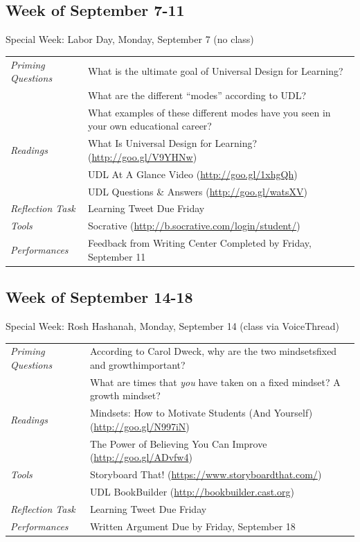 \documentclass{tufte-handout}
\newcommand{\tabpq}{\faQuestionCircle\medspace\textit{Priming Questions}}
\newcommand{\tabread}{\faBook\medspace\textit{Readings}}
\newcommand{\tabperformance}{\faTasks\medspace\textit{Performances}}
\newcommand{\tabtools}{\faWrench\medspace\textit{Tools}}
\newcommand{\tabtweet}{\faLightbulbO\medspace\textit{Reflection Task} & Learning Tweet Due Friday \\}
\newenvironment{tabsched}
	{\small
	\begin{tabular}{p{1.5in}p{4.5in}}
	\toprule}
	{\bottomrule
	\end{tabular}
	\normalsize}
\newenvironment{specweek}
	{\begin{center}
		\fontseries{b} \faBullhorn \medspace Special Week: }
		{\medspace \faBullhorn \fontseries{m}
	\end{center}}
\newcommand{\weekfour}{September 7-11}
\newcommand{\weekfive}{September 14-18}
\newcommand{\laborday}{Labor Day, Monday, September 7 (no class)}
\newcommand{\roshhashanah}{Rosh Hashanah, Monday, September 14 (class via VoiceThread)}
\begin{document}
\subsection{Week of \weekfour}

\begin{specweek}\laborday\end{specweek}

\begin{tabsched}
	\tabpq & What is the ultimate goal of Universal Design for Learning? \\
	& What are the different \enquote{modes} according to UDL? \\
	& What examples of these different modes have you seen in your own educational career? \\
	\midrule
	\tabread & What Is Universal Design for Learning? (\url{http://goo.gl/V9YHNw}) \\
	& UDL At A Glance Video (\url{http://goo.gl/1xhgQh}) \\
	& UDL Questions \& Answers (\url{http://goo.gl/watsXV}) \\
	\midrule
	\tabtweet
	\midrule
	\tabtools & Socrative (\url{http://b.socrative.com/login/student/}) \\
	\midrule
	\tabperformance & Feedback from Writing Center Completed by Friday, September 11 \\
\end{tabsched}
\newpage
\subsection{Week of \weekfive}

\begin{specweek}\roshhashanah\end{specweek}

\begin{tabsched}
	\tabpq & According to Carol Dweck, why are the two mindsets\textemdash{}fixed and growth\textemdash{}important? \\
	& What are times that \emph{you} have taken on a fixed mindset? A growth mindset? \\
	\midrule
	\tabread & Mindsets: How to Motivate Students (And Yourself) (\url{http://goo.gl/N997iN}) \\
	& The Power of Believing You Can Improve (\url{http://goo.gl/ADvfw4}) \\
	\midrule
	\tabtools & Storyboard That! (\url{https://www.storyboardthat.com/}) \\
	& UDL BookBuilder (\url{http://bookbuilder.cast.org}) \\
	\midrule
	\tabtweet
	\midrule
	\tabperformance & Written Argument Due by Friday, September 18 \\
\end{tabsched}
\end{document}
